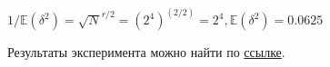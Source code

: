 \documentclass[utf8x, 14pt]{G7-32} %
\begin{document}
$1/\mathbb{E}(\delta^2)=\sqrt{N}^{r/2} = (2^4)^(2/2) = 2^4, \mathbb{E}(\delta^2) = 0.0625$

Результаты эксперимента можно найти по \href{https://github.com/jerrydie/course_work}{ссылке}.





\backmatter %





%

%
\end{document}
